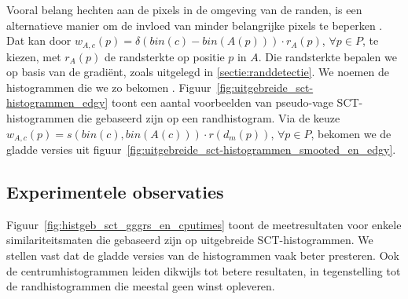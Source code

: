 Vooral belang hechten aan de pixels in de omgeving van de randen, is een alternatieve
manier om de invloed van minder belangrijke pixels te beperken 
\cite{vertan:upgrading_color_distribution_for_ir}. Dat kan door 
$w_{A,c}(p)=\delta(bin(c)-bin(A(p))) \cdot r_{A}(p)$, $\forall p \in P$, te kiezen, met $r_{A}(p)$ de randsterkte op positie $p$ in $A$.
Die randsterkte bepalen we op basis van de gradi\"ent, zoals uitgelegd in \ref{sectie:randdetectie}.  
We noemen de histogrammen die we zo bekomen . 
Figuur~\ref{fig:uitgebreide_sct-histogrammen_edgy} toont een aantal voorbeelden van
pseudo-vage SCT-histogrammen die gebaseerd zijn op een randhistogram.
Via de keuze $w_{A,c}(p)=s(bin(c),bin(A(c))) \cdot r(d_m(p))$, $\forall p \in P$, 
bekomen we de gladde versies uit
figuur~\ref{fig:uitgebreide_sct-histogrammen_smooted_en_edgy}. 



\subsection{Experimentele observaties}

Figuur~\ref{fig:histgeb_sct_gggrs_en_cputimes} toont de meetresultaten voor enkele
similariteitsmaten die gebaseerd zijn op uitgebreide SCT-histogrammen. We stellen
vast dat de gladde versies van de histogrammen vaak beter presteren. Ook de
centrumhistogrammen leiden dikwijls tot betere resultaten, in tegenstelling tot de 
randhistogrammen die meestal geen winst opleveren.

